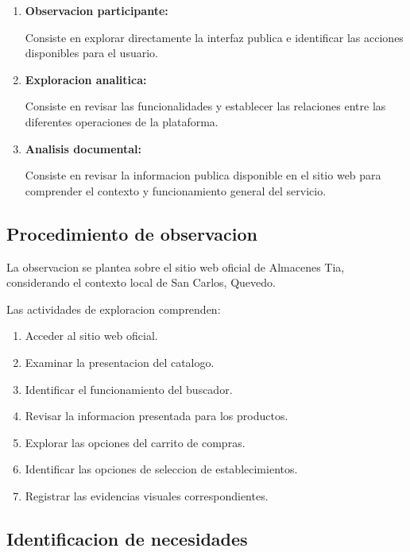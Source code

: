\documentclass[11pt,a4paper]{article}
\begin{document}
\begin{enumerate}

    \item \textbf{Observacion participante:}

    Consiste en explorar directamente la interfaz
    publica e identificar las acciones disponibles
    para el usuario.

    \item \textbf{Exploracion analitica:}

    Consiste en revisar las funcionalidades y
    establecer las relaciones entre las diferentes
    operaciones de la plataforma.

    \item \textbf{Analisis documental:}

    Consiste en revisar la informacion publica
    disponible en el sitio web para comprender
    el contexto y funcionamiento general del servicio.

\end{enumerate}

\subsection{Procedimiento de observacion}

La observacion se plantea sobre el sitio web oficial
de Almacenes Tia, considerando el contexto local
de San Carlos, Quevedo.

Las actividades de exploracion comprenden:

\begin{enumerate}
    \item Acceder al sitio web oficial.
    \item Examinar la presentacion del catalogo.
    \item Identificar el funcionamiento del buscador.
    \item Revisar la informacion presentada para
    los productos.
    \item Explorar las opciones del carrito de compras.
    \item Identificar las opciones de seleccion
    de establecimientos.
    \item Registrar las evidencias visuales
    correspondientes.
\end{enumerate}

\subsection{Identificacion de necesidades}
\end{document}
